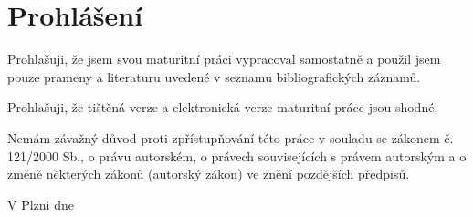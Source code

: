 \section*{Prohlášení}

Prohlašuji, že jsem svou maturitní práci vypracoval samostatně a použil jsem
pouze prameny a literaturu uvedené v seznamu bibliografických záznamů.

Prohlašuji, že tištěná verze a elektronická verze maturitní práce jsou shodné.

Nemám závažný důvod proti zpřístupňování této práce v souladu se zákonem č.
121/2000 Sb., o právu autorském, o právech souvisejících s právem autorským a o
změně některých zákonů (autorský zákon) ve znění pozdějších předpisů.

V Plzni dne
